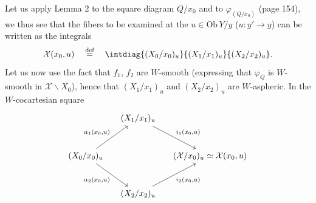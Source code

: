 Let us apply Lemma 2 to the square diagram $Q/x_0$ and to $\varphi_{(Q/x_0)}$ (page 154), we thus see that the fibers to be examined at the $u\in\mathrm{Ob}\,Y/y$ ($u : y'\longrightarrow y$) can be written as the integrals
\[
\mathcal{X}(x_0,u) \quad\overset{\text{def}}{=}\quad \intdiag{(X_0/x_0)_u}{(X_1/x_1)_u}{(X_2/x_2)_u} .
\]
Let us now use the fact that $f_1$, $f_2$ are $W$-smooth (expressing that $\varphi_Q$ is $W$-smooth in $\mathcal{X}\backslash X_0$), hence that $(X_1/x_1)_u$ and $(X_2/x_2)_u$ are $W$-aspheric. In the $W$-cocartesian square
\[
\begin{tikzcd}[row sep=large,column sep=small]
 & (X_1/x_1)_u \arrow[dr, "{i_1(x_0,u)}"] & \\
(X_0/x_0)_u \arrow[ur, "{\alpha_1(x_0,u)}"] \arrow[dr, "{\alpha_2(x_0,u)}"'] & & (\mathcal{X}/x_0)_u\simeq\mathcal{X}(x_0,u) \\
 & (X_2/x_2)_u \arrow[ur, "{i_2(x_0,u)}"'] &
\end{tikzcd}
\]
